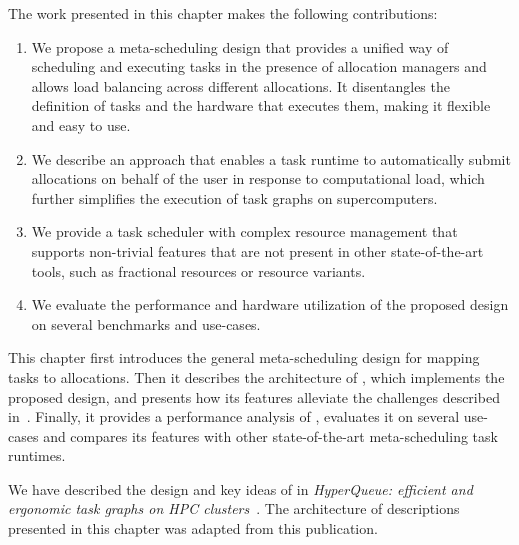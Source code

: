The work presented in this chapter makes the following contributions:
\begin{enumerate}
	\item We propose a meta-scheduling design that provides a unified way of scheduling and executing tasks
	      in the presence of allocation managers and allows load balancing across different allocations. It
	      disentangles the definition of tasks and the hardware that executes them, making it flexible and
	      easy to use.
	\item We describe an approach that enables a task runtime to automatically submit allocations on behalf
	      of the user in response to computational load, which further simplifies the execution of task
	      graphs on supercomputers.
	\item We provide a task scheduler with complex resource management that supports non-trivial features
	      that are not present in other state-of-the-art tools, such as fractional resources or resource
	      variants.
	\item We evaluate the performance and hardware utilization of the proposed design on several benchmarks
	      and use-cases.
\end{enumerate}

This chapter first introduces the general meta-scheduling design for mapping tasks to allocations.
Then it describes the architecture of \hyperqueue{}, which implements the proposed
design, and presents how its features alleviate the challenges described
in~. Finally, it provides a performance analysis of \hyperqueue{},
evaluates it on several use-cases and compares its features with other state-of-the-art
meta-scheduling task runtimes.

We have described the design and key ideas of \hyperqueue{} in
\emph{HyperQueue: efficient and ergonomic task graphs on HPC clusters}~\cite{hyperqueue}. The architecture of \hyperqueue{}
descriptions presented in this chapter was adapted from this publication.


